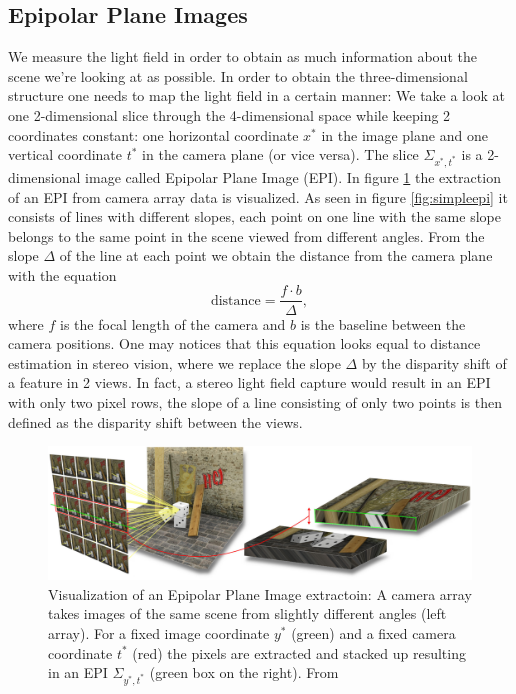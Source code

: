 \documentclass  [
  paper    = a4,
  BCOR     = 10mm,
  twoside,
  fontsize = 12pt,
  fleqn,
  toc      = bibnumbered,
  toc      = listofnumbered,
  numbers  = noendperiod,
  headings = normal,
  listof   = leveldown,
  version  = 3.03
]                                       {scrreprt}
\begin{document}
\subsection{Epipolar Plane Images}
\label{sec:epi}
We measure the light field in order to obtain as much information about the scene we're looking at as possible. In order to obtain the three-dimensional structure one needs to map the light field in a certain manner: We take a look at one 2-dimensional slice through the 4-dimensional space while keeping 2 coordinates constant: one horizontal coordinate  $x^{*}$  in the image plane and one vertical coordinate $t^{*}$ in the camera plane (or vice versa). The slice $\Sigma_{x^{*}, t^{*}}$ is a 2-dimensional image called Epipolar Plane Image (EPI). In figure \ref{fig:epivisualization} the extraction of an EPI from camera array data is visualized. As seen in figure \ref{fig:simpleepi} it consists of lines with different slopes, each point on one line with the same slope belongs to the same point in the scene viewed from different angles. From the slope $\Delta$ of the line at each point we obtain the distance from the camera plane with the equation
\begin{equation}\label{eq:distance}
\text{distance} = \frac{f\cdot b}{\Delta},
\end{equation}
where $f$ is the focal length of the camera and $b$ is the baseline between the camera positions. One may notices that this equation looks equal to distance estimation in stereo vision, where we replace the slope $\Delta$ by the disparity shift of a feature in 2 views. In fact, a stereo light field capture would result in an EPI with only two pixel rows, the slope of a line consisting of only two points is then defined as the disparity shift between the views.

\begin{figure}
	\centering
	\includegraphics[width=1\linewidth]{images/epiVisualization}
	\caption[Visualization of an EPI extraction]{Visualization of an Epipolar Plane Image extractoin: A camera array takes images of the same scene from slightly different angles (left array). For a fixed image coordinate $y^*$ (green) and a fixed camera coordinate $t^*$ (red) the pixels are extracted and stacked up resulting in an EPI $\Sigma_{y^*, t^*}$ (green box on the right). From   \cite{iwr.uni-heidelberg.de} }
	\label{fig:epivisualization}
\end{figure}
\end{document}
